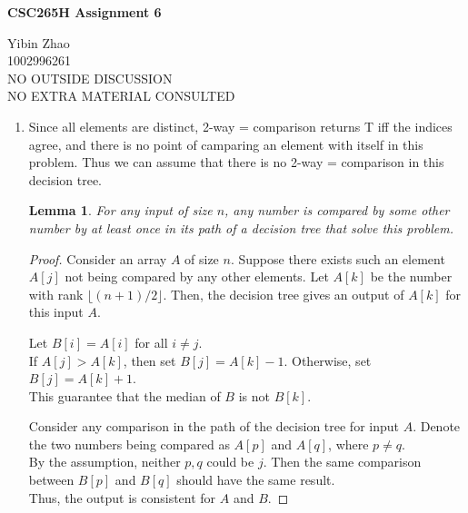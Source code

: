 \documentclass[10pt]{article}
\newtheorem{lemma}[theorem]{Lemma}
\begin{document}
\begin{center}
{\bf \Large \bf CSC265H Assignment 6}
\end{center}

\noindent
Yibin Zhao\\
1002996261\\
NO OUTSIDE DISCUSSION\\
NO EXTRA MATERIAL CONSULTED\\

\begin{comment}
The median of a set of numbers is the element with rank $\lfloor (n+1)/2 \rfloor$.
\end{comment}

\begin{enumerate}
	
	\begin{comment}
	Prove that any decesion tree using 2-way comparisons that finds the median of $n$ distinct numbers 
	also determines the set of numbers greater than the median and the set of numbers smaller than the median.
	\end{comment}

	\item
	Since all elements are distinct, 2-way = comparison returns T iff the indices agree, and there is no point of camparing an element with itself in this problem. 
	Thus we can assume that there is no 2-way = comparison in this decision tree.

	\begin{lemma}
	For any input of size $n$, any number is compared by some other number by at least once in its path
	of a decision tree that solve this problem.
	\end{lemma}

	\begin{proof}
	Consider an array $A$ of size $n$. 
	Suppose there exists such an element $A[j]$ not being compared by any other elements.
	Let $A[k]$ be the number with rank $\lfloor (n+1)/2 \rfloor$.
	Then, the decision tree gives an output of $A[k]$ for this input $A$. 

	Let $B[i] = A[i]$ for all $i \neq j$. \\
	If $A[j] > A[k]$, then set $B[j] = A[k]-1$. 
	Otherwise, set $B[j] = A[k]+1$. \\
	This guarantee that the median of $B$ is not $B[k]$.
	
	Consider any comparison in the path of the decision tree for input $A$.
	Denote the two numbers being compared as $A[p]$ and $A[q]$, where $p \neq q$. \\
	By the assumption, neither $p, q$ could be $j$. 
 	Then the same comparison between $B[p]$ and $B[q]$ should have the same result. \\
	Thus, the output is consistent for $A$ and $B$.
	

\end{proof}
\end{enumerate}
\end{document}
